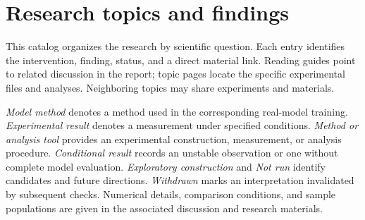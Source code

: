 \FloatBarrier\clearpage
\section{Research topics and findings}
\label{app:catalog}

This catalog organizes the research by scientific question. Each entry identifies the intervention, finding, status, and a direct material link. Reading guides point to related discussion in the report; topic pages locate the specific experimental files and analyses. Neighboring topics may share experiments and materials.

\textit{Model method} denotes a method used in the corresponding real-model training. \textit{Experimental result} denotes a measurement under specified conditions. \textit{Method or analysis tool} provides an experimental construction, measurement, or analysis procedure. \textit{Conditional result} records an unstable observation or one without complete model evaluation. \textit{Exploratory construction} and \textit{Not run} identify candidates and future directions. \textit{Withdrawn} marks an interpretation invalidated by subsequent checks. Numerical details, comparison conditions, and sample populations are given in the associated discussion and research materials.


